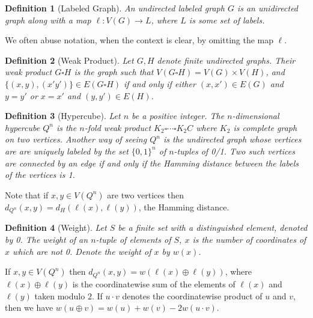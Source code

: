 \documentclass{article}
\newtheorem{definition}{Definition}
\begin{document}
\begin{definition}[Labeled Graph]
  An undirected \emph{labeled graph} $G$ is an unidirected graph along
  with a map $\ell: V(G) \rightarrow L$, where $L$ is some set of
  labels.
\end{definition}
We often abuse notation, when the context is clear, by omitting the
map $\ell$.
\begin{definition}[Weak Product]
Let $G, H$ denote finite undirected graphs.  Their \emph{weak product}
$G \square H$ is the graph such that $V(G \square H) = V(G) \times V(H)$,
and $\{(x,y),(x'y')\} \in E(G \square H)$ if and only if either $(x,x')
\in E(G)$ and $y=y'$ or $x=x'$ and $(y,y') \in E(H)$.
\end{definition}
\begin{definition}[Hypercube]
  Let $n$ be a positive integer. The $n$-dimensional \emph{hypercube}
  $Q^n$ is the $n$-fold weak product $K_2 \square \cdots \square K_2C$ where
  $K_2$ is complete graph on two vertices.  Another way of seeing
  $Q^n$ is the undirected graph whose vertices are are uniquely
  labeled by the set $\{0,1\}^n$ of $n$-tuples of 0/1.  Two such
  vertices are connected by an edge if and only if the Hamming
  distance between the labels of the vertices is 1.
\end{definition}
Note that if $x,y \in V(Q^n)$ are two vertices then $d_{Q^n}(x,y) =
d_H(\ell(x),\ell(y))$, the Hamming distance.
\begin{definition}[Weight]
  Let $S$ be a finite set with a distinguished element, denoted by 0.
  The \emph{weight} of an $n$-tuple of elements of $S$, $x$ is the number
  of coordinates of $x$ which are not 0.  Denote the weight of $x$ by $w(x)$.
\end{definition}

If $x,y \in V(Q^n)$ then $d_{Q^n}(x,y) = w(\ell(x) \oplus \ell(y))$, where $\ell(x)
\oplus \ell(y)$ is the coordinatewise sum of the elements of $\ell(x)$ and $\ell(y)$
taken modulo 2.  If $u \cdot v$ denotes the coordinatewise product of $u$
and $v$, then we have $w(u \oplus v) = w(u) + w(v) - 2 w(u \cdot v)$.
\end{document}
